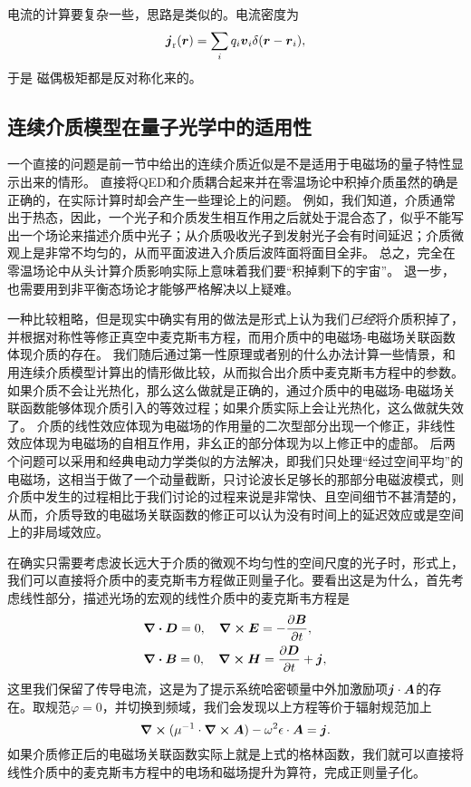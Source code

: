 电流的计算要复杂一些，思路是类似的。电流密度为
\[
    \vb*{j}_\text{r}(\vb*{r}) = \sum_i q_i \vb*{v}_i \delta(\vb*{r} - \vb*{r}_i),
\]
于是
磁偶极矩都是反对称化来的。

\subsection{连续介质模型在量子光学中的适用性}\label{sec:quantum-continuum}

一个直接的问题是前一节中给出的连续介质近似是不是适用于电磁场的量子特性显示出来的情形。
直接将QED和介质耦合起来并在零温场论中积掉介质虽然的确是正确的，在实际计算时却会产生一些理论上的问题。
例如，我们知道，介质通常出于热态，因此，一个光子和介质发生相互作用之后就处于混合态了，似乎不能写出一个场论来描述介质中光子；从介质吸收光子到发射光子会有时间延迟；介质微观上是非常不均匀的，从而平面波进入介质后波阵面将面目全非。
总之，完全在零温场论中从头计算介质影响实际上意味着我们要“积掉剩下的宇宙”。
退一步，也需要用到非平衡态场论才能够严格解决以上疑难。

一种比较粗略，但是现实中确实有用的做法是形式上认为我们\emph{已经}将介质积掉了，并根据对称性等修正真空中麦克斯韦方程，而用介质中的电磁场-电磁场关联函数体现介质的存在。
我们随后通过第一性原理或者别的什么办法计算一些情景，和用连续介质模型计算出的情形做比较，从而拟合出介质中麦克斯韦方程中的参数。
如果介质不会让光热化，那么这么做就是正确的，通过介质中的电磁场-电磁场关联函数能够体现介质引入的等效过程；如果介质实际上会让光热化，这么做就失效了。
介质的线性效应体现为电磁场的作用量的二次型部分出现一个修正，非线性效应体现为电磁场的自相互作用，非幺正的部分体现为以上修正中的虚部。
后两个问题可以采用和经典电动力学类似的方法解决，即我们只处理“经过空间平均”的电磁场，这相当于做了一个动量截断，只讨论波长足够长的那部分电磁波模式，则介质中发生的过程相比于我们讨论的过程来说是非常快、且空间细节不甚清楚的，从而，介质导致的电磁场关联函数的修正可以认为没有时间上的延迟效应或是空间上的非局域效应。

在确实只需要考虑波长远大于介质的微观不均匀性的空间尺度的光子时，形式上，我们可以直接将介质中的麦克斯韦方程做正则量子化。要看出这是为什么，首先考虑线性部分，描述光场的宏观的线性介质中的麦克斯韦方程是
\[
    \begin{aligned}
        &\div{\vb*{D}} = 0, \quad \curl{\vb*{E}} = - \pdv{\vb*{B}}{t}, \\
        &\div{\vb*{B}} = 0, \quad \curl{\vb*{H}} = \pdv{\vb*{D}}{t} + \vb*{j},
    \end{aligned}
\]
这里我们保留了传导电流，这是为了提示系统哈密顿量中外加激励项$\vb*{j} \cdot \vb*{A}$的存在。取规范$\varphi=0$，并切换到频域，我们会发现以上方程等价于辐射规范加上
\begin{equation}
    \curl{(\mu^{-1} \cdot \curl{\vb*{A}})} - \omega^2 \epsilon \cdot \vb*{A} = \vb*{j}.
    \label{eq:photon-in-material}
\end{equation}
如果介质修正后的电磁场关联函数实际上就是上式的格林函数，我们就可以直接将线性介质中的麦克斯韦方程中的电场和磁场提升为算符，完成正则量子化。

